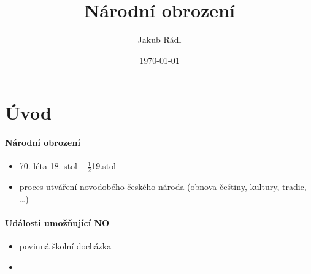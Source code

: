 \documentclass[10pt,a4paper]{article}
\title{Národní obrození}
\date{\today}
\author{Jakub Rádl}
\begin{document}
\maketitle
\tableofcontents
\newpage

\section{Úvod}
\paragraph{Národní obrození}
\begin{itemize}
\item 70. léta 18. stol -- $\frac{1}{2}$19.stol
\item proces utváření novodobého českého národa (obnova češtiny, kultury, tradic, \ldots)
\end{itemize}
\paragraph{Události umožňující NO}
\begin{itemize}
\item povinná školní docházka
\item 
\end{itemize}
\end{document}
